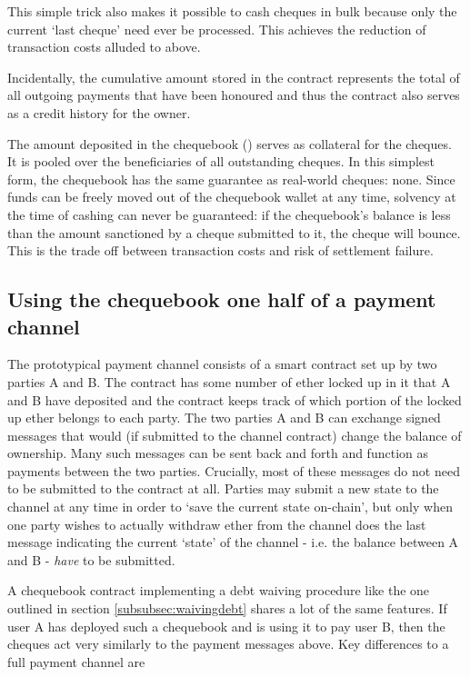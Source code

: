 This simple trick also makes it possible to cash cheques in bulk because only the current `last cheque' need ever be processed. This achieves the reduction of transaction costs alluded to above.

Incidentally, the cumulative amount stored in the contract represents the total of all outgoing payments that have been honoured and thus the contract also serves as a credit history for the owner.

The amount deposited in the chequebook () serves as collateral for the cheques. It is pooled over the beneficiaries of all outstanding cheques.
In this simplest form, the chequebook has the same guarantee as real-world cheques: none. Since funds can be freely moved out of the chequebook wallet at any time, solvency at the time of cashing can never be guaranteed: if the chequebook's balance is less than the amount sanctioned by a cheque submitted to it, the cheque will bounce. This is the trade off between transaction costs and risk of settlement failure.






\subsection{Using the chequebook one half of a payment channel}
The prototypical payment channel consists of a smart contract set up by two parties A and B. The contract has some number of ether locked up in it that A and B have deposited and the contract keeps track of which portion of the locked up ether belongs to each party. The two parties A and B can exchange signed messages that would (if submitted to the channel contract) change the balance of ownership. Many such messages can be sent back and forth and function as payments between the two parties. Crucially, most of these messages do not need to be submitted to the contract at all. Parties may submit a new state to the channel at any time in order to `save the current state on-chain', but only when one party wishes to actually withdraw ether from the channel does the last message indicating the current `state' of the channel - i.e. the balance between A and B - \emph{have} to be submitted.

A chequebook contract implementing a debt waiving procedure like the one outlined in section \ref{subsubsec:waivingdebt} shares a lot of the same features. If user A has deployed such a chequebook and is using it to pay user B, then the cheques act very similarly to the payment messages above. Key differences to a full payment channel are

